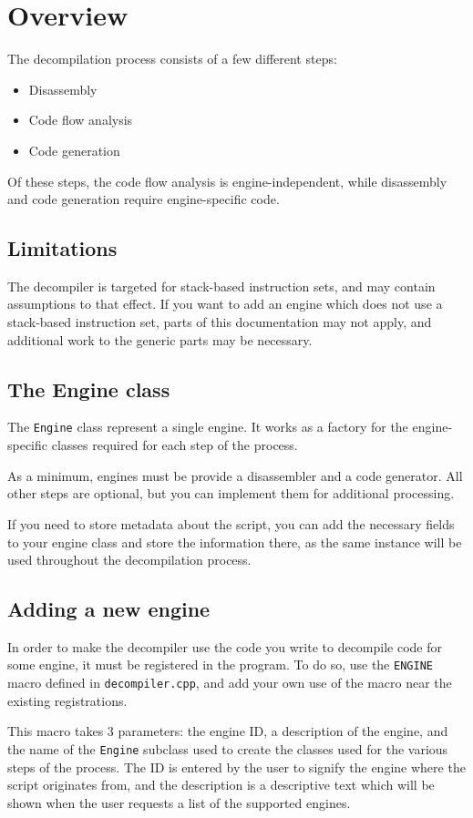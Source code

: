 \section{Overview}
The decompilation process consists of a few different steps:

\begin{itemize}
\item Disassembly
\item Code flow analysis
\item Code generation
\end{itemize}

Of these steps, the code flow analysis is engine-independent, while disassembly and code generation require engine-specific code.

\subsection{Limitations}
The decompiler is targeted for stack-based instruction sets, and may contain assumptions to that effect. If you want to add an engine which does not use a stack-based instruction set, parts of this documentation may not apply, and additional work to the generic parts may be necessary.

\subsection{The Engine class}
The \verb+Engine+ class represent a single engine. It works as a factory for the engine-specific classes required for each step of the process.

As a minimum, engines must be provide a disassembler and a code generator. All other steps are optional, but you can implement them for additional processing.

If you need to store metadata about the script, you can add the necessary fields to your engine class and store the information there, as the same instance will be used throughout the decompilation process.

\subsection{Adding a new engine}
In order to make the decompiler use the code you write to decompile code for some engine, it must be registered in the program. To do so, use the \verb+ENGINE+ macro defined in \verb+decompiler.cpp+, and add your own use of the macro near the existing registrations.

This macro takes 3 parameters: the engine ID, a description of the engine, and the name of the \verb+Engine+ subclass used to create the classes used for the various steps of the process. The ID is entered by the user to signify the engine where the script originates from, and the description is a descriptive text which will be shown when the user requests a list of the supported engines.
